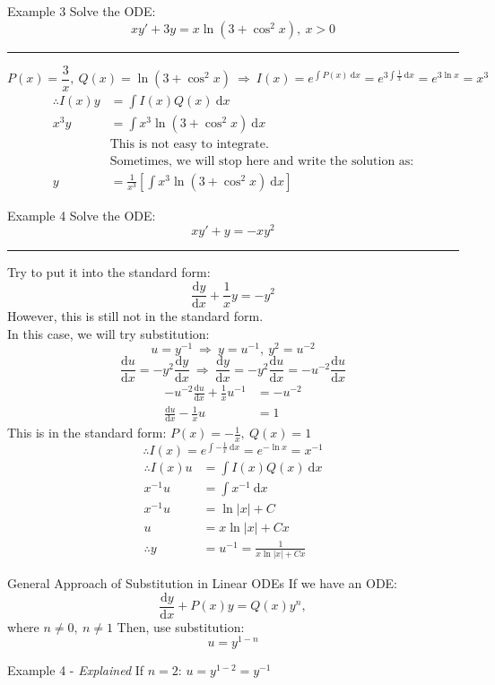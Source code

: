 \documentclass[12pt,a4paper]{article}
\def\d{{\mathrm{d}}}
\def\dydx{\frac{\d y}{\d x}}
\def\dx{\d x}
\begin{document}
\begin{eg}{Example 3}
	Solve the ODE: $$xy'+3y=x\ln(3+\cos^2x),\ x>0$$	
	\noindent\rule[0.25\baselineskip]{\textwidth}{1pt}	
	$$P(x)=\frac{3}{x},\ Q(x)=\ln(3+\cos^2x)\ \Rightarrow\ I(x)=e^{\int P(x)\ \dx}=e^{3\int\frac{1}{x}\ \dx}=e^{3\ln x}=x^3$$
	$$\begin{aligned}
		\therefore I(x)y&=\int I(x)Q(x)\ \dx\\
		x^3y&=\boxed{\int x^3\ln(3+\cos^2x)\ \dx}\\
		&\text{This is not easy to integrate.} \\
		&\text{Sometimes, we will stop here and write the solution as:}\\
		y&=\frac{1}{x^3}\left[\int x^3\ln(3+\cos^2x)\ \dx\right]
	\end{aligned}$$
\end{eg}
\begin{eg}{Example 4}
	Solve the ODE: $$xy'+y=-xy^2$$	
	\noindent\rule[0.25\baselineskip]{\textwidth}{1pt}
	Try to put it into the standard form: 
	$$\dydx+\frac{1}{x}y=-y^2$$
	However, this is still not in the standard form. \\
	In this case, we will  try substitution: 
	$$u=y^{-1}\ \Rightarrow\ y=u^{-1},\ y^2=u^{-2}$$
	$$\frac{\d u}{\d x}=-y^2\dydx\ \Rightarrow\ \dydx=-y^2\frac{\d u}{\d x}=-u^{-2}\frac{\d u}{\d x}$$
	$$\begin{aligned}
		-u^{-2}\frac{\d u}{\d x}+\frac{1}{x}u^{-1}&=-u^{-2}\\
		\frac{\d u}{\d x}-\frac{1}{x}u&=1
	\end{aligned}$$
	This is in the standard form: $\displaystyle P(x)=-\frac{1}{x},\ Q(x)=1$
	$$\therefore I(x)=e^{\int-\frac{1}{x}\ \dx}=e^{-\ln x}=x^{-1}$$
	$$\begin{aligned}
		\therefore I(x)u&=\int I(x)Q(x)\ \dx\\
		x^{-1}u&=\int x^{-1}\ \dx\\
		x^{-1}u&=\ln|x|+C\\
		u&=x\ln|x|+Cx\\
		\therefore y&=u^{-1}=\frac{1}{x\ln|x|+Cx}
	\end{aligned}$$
\end{eg}
\begin{thm}{General Approach of Substitution in Linear ODEs}
	If we have an ODE: $$\dydx+P(x)y=Q(x)y^n,$$where $n\neq 0,\ n\neq 1$	
	Then, use substitution: $$u=y^{1-n}$$
\end{thm}
\begin{eg}{Example 4 - \textit{Explained}}
	If $n=2$: $u=y^{1-2}=y^{-1}$
\end{eg}
\end{document}

